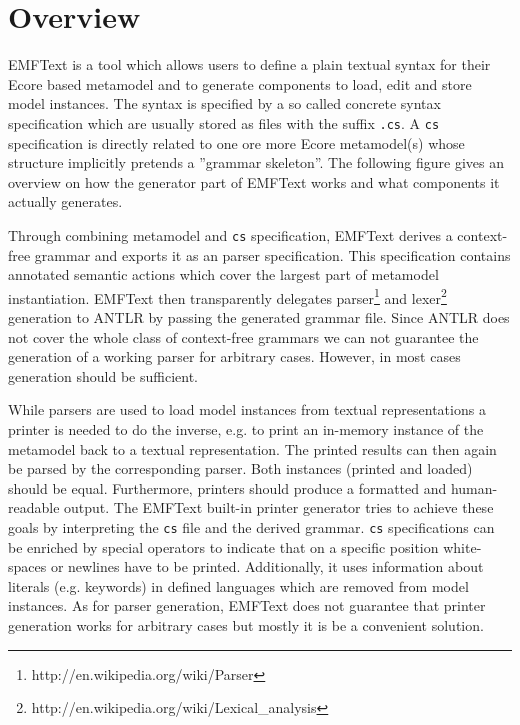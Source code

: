\chapter{Overview}

EMFText is a tool which allows users to define a plain textual syntax for their
Ecore based metamodel and to generate components to load, edit and store model 
instances. The syntax is specified by a so called concrete syntax specification 
which are usually stored as files with the suffix \texttt{.cs}. A \texttt{cs}
specification is directly related to one ore more Ecore metamodel(s) whose structure implicitly 
pretends a ''grammar skeleton''. The following figure gives an overview on how the 
generator part of EMFText works and what components it actually generates.


Through combining metamodel and \texttt{cs} specification, EMFText derives a context-free 
grammar and exports it as an \ANTLR parser specification. This specification
contains annotated semantic actions which cover the largest part of metamodel 
instantiation. EMFText then transparently delegates
parser\footnote{http://en.wikipedia.org/wiki/Parser} and 
lexer\footnote{http://en.wikipedia.org/wiki/Lexical\_analysis} generation to
ANTLR by passing the generated grammar file. Since ANTLR does not cover the whole class of 
context-free grammars we can not guarantee the generation of a working parser 
for arbitrary cases. However, in most cases generation should be sufficient.

While parsers are used to load model instances from textual representations a 
printer is needed to do the inverse, e.g. to print an in-memory instance of the 
metamodel back to a textual representation. The printed results can then 
again be parsed by the corresponding parser. Both instances (printed and
loaded) should be equal. Furthermore, printers should produce a formatted and human-readable output. 
The EMFText built-in printer generator tries to achieve these goals by interpreting 
the \texttt{cs} file and the derived grammar. \texttt{cs} specifications can be enriched by 
special operators to indicate that on a specific position white-spaces or newlines 
have to be printed. Additionally, it uses information about literals (e.g. keywords) 
in defined languages which are removed from model instances. As for parser generation, 
EMFText does not guarantee that printer generation works for arbitrary cases but 
mostly it is be a convenient solution.

